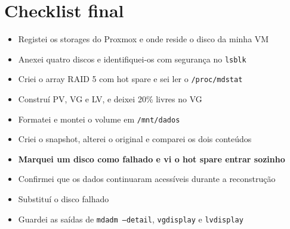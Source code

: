 \documentclass[11pt,a4paper]{article}
\begin{document}
\section{Checklist final}

\begin{itemize}
  \item[$\square$] Registei os storages do Proxmox e onde reside o disco da minha VM
  \item[$\square$] Anexei quatro discos e identifiquei-os com segurança no \texttt{lsblk}
  \item[$\square$] Criei o array RAID 5 com hot spare e sei ler o \texttt{/proc/mdstat}
  \item[$\square$] Construí PV, VG e LV, e deixei 20\% livres no VG
  \item[$\square$] Formatei e montei o volume em \texttt{/mnt/dados}
  \item[$\square$] Criei o snapshot, alterei o original e comparei os dois conteúdos
  \item[$\square$] \textbf{Marquei um disco como falhado e vi o hot spare entrar sozinho}
  \item[$\square$] Confirmei que os dados continuaram acessíveis durante a reconstrução
  \item[$\square$] Substituí o disco falhado
  \item[$\square$] Guardei as saídas de \texttt{mdadm --detail}, \texttt{vgdisplay} e \texttt{lvdisplay}
\end{itemize}
\end{document}
